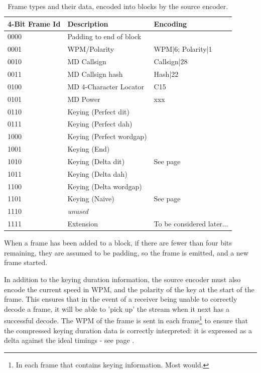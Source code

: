 \documentclass[a4paper]{tufte-handout}
\begin{document}
    \begin{table}[h]

        \selectfont
        \begin{tabular}{lll}
            \toprule
            4-Bit Frame Id & Description & Encoding \\
            \midrule
            0000 & Padding to end of block &  \\
            0001 & WPM/Polarity & WPM|6; Polarity|1 \\ 
            0010 & MD Callsign & Callsign|28 \\
            0011 & MD Callsign hash & Hash|22 \\
            0100 & MD 4-Character Locator & C15 \\
            0101 & MD Power & xxx \\
            0110 & Keying (Perfect dit) & \\
            0111 & Keying (Perfect dah) & \\
            1000 & Keying (Perfect wordgap) & \\
            1001 & Keying (End) & \\
            1010 & Keying (Delta dit) & See page \pageref{section:delta-encoding} \\
            1011 & Keying (Delta dah) & \\
            1100 & Keying (Delta wordgap) & \\
            1101 & Keying (Naïve) & See page \pageref{section:naive-encoding} \\
            1110 & \emph{unused} & \\
            1111 & Extension & To be considered later... \\
		\end{tabular}
		\caption{Frame types and their data, encoded into blocks by the source encoder.}
		\label{table:frame-types}
	\end{table}

When a frame has been added to a block, if there are fewer than four bits remaining, they are assumed to be padding, so the frame is emitted, and a new frame started.

In addition to the keying duration information, the source encoder must also encode the current speed in WPM, and the polarity of the key at the start of the frame. This ensures that in the event of a receiver being unable to correctly decode a frame, it will be able to 'pick up' the stream when it next has a successful decode. The WPM of the frame is sent in each frame\footnote{In each frame that contains keying information. Most would.} to ensure that the compressed keying duration data is correctly interpreted: it is expressed as a delta against the ideal timings - see page \pageref{section:delta-encoding}.
\end{document}
